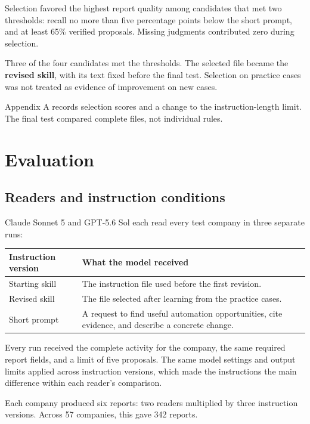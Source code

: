 \documentclass[11pt]{article}
\begin{document}
Selection favored the highest report quality among candidates that met two thresholds: recall no more than five percentage points below the short prompt, and at least 65\% verified proposals. Missing judgments contributed zero during selection.

Three of the four candidates met the thresholds. The selected file became the \textbf{revised skill}, with its text fixed before the final test. Selection on practice cases was not treated as evidence of improvement on new cases.

Appendix A records selection scores and a change to the instruction-length limit. The final test compared complete files, not individual rules.

\section{Evaluation}
\subsection{Readers and instruction conditions}
Claude Sonnet 5 and GPT-5.6 Sol each read every test company in three separate runs:

\begin{center}
\small
\setlength{\tabcolsep}{4pt}
\renewcommand{\arraystretch}{1.25}
\begin{tabularx}{\linewidth}{@{}>{\raggedright\arraybackslash}X>{\raggedright\arraybackslash}X@{}}
\toprule
\textbf{Instruction version} & \textbf{What the model received} \\
\midrule
Starting skill & The instruction file used before the first revision. \\
Revised skill & The file selected after learning from the practice cases. \\
Short prompt & A request to find useful automation opportunities, cite evidence, and describe a concrete change. \\
\bottomrule
\end{tabularx}
\end{center}
Every run received the complete activity for the company, the same required report fields, and a limit of five proposals. The same model settings and output limits applied across instruction versions, which made the instructions the main difference within each reader's comparison.

Each company produced six reports: two readers multiplied by three instruction versions. Across 57 companies, this gave 342 reports.
\end{document}
